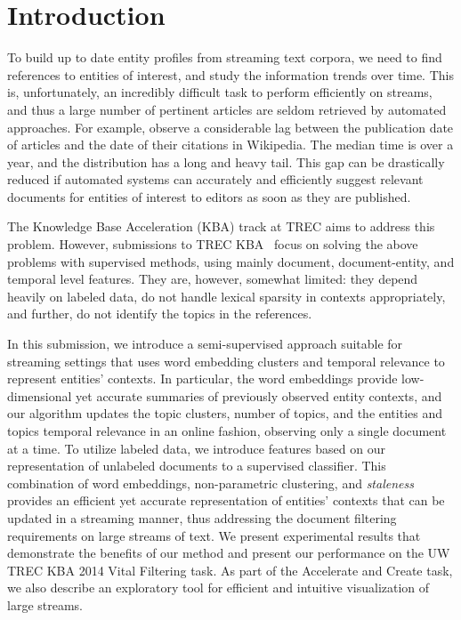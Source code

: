 \documentclass{article}
\begin{document}
\section{Introduction}
\label{intro}

To build up to date entity profiles from streaming text corpora, we need to find references to entities of interest, and study the information trends over time. 
This is, unfortunately, an incredibly difficult task to perform efficiently on streams, and thus a large number of pertinent articles are seldom retrieved by automated approaches.
For example, \citet{frank12} observe a considerable lag between the publication date of articles and the date of their citations in Wikipedia.
The median time is over a year, and the distribution has a long and heavy tail. 
This gap can be drastically reduced if automated systems can accurately and efficiently suggest relevant documents for entities of interest to editors as soon as they are published.

The Knowledge Base Acceleration (KBA) track at TREC aims to address this problem.
However, submissions to TREC KBA~\cite{xitong13, bouvier13, efron13, zhang13, bellogin13} focus on solving the above problems with supervised methods, using mainly document, document-entity, and temporal level features.
They are, however, somewhat limited: they depend heavily on labeled data, do not handle lexical sparsity in contexts appropriately, and further, do not identify the topics in the references. %


In this submission, we introduce a semi-supervised approach suitable for streaming settings that uses word embedding clusters and temporal relevance to represent entities' contexts. %
In particular, the word embeddings provide low-dimensional yet accurate summaries of previously observed entity contexts, and our algorithm updates the topic clusters, number of topics, and the entities and topics temporal relevance in an online fashion, observing only a single document at a time.
To utilize labeled data, we introduce features based on our representation of unlabeled documents to a supervised classifier.
%
This combination of word embeddings, non-parametric clustering, and \emph{staleness} provides an efficient yet accurate representation of entities' contexts that can be updated in a streaming manner, thus addressing the document filtering requirements on large streams of text.
We present experimental results that demonstrate the benefits of our method and present our performance on the UW TREC KBA 2014 Vital Filtering task.
As part of the Accelerate and Create task, we also describe an exploratory tool for efficient and intuitive visualization of large streams.
\end{document}
